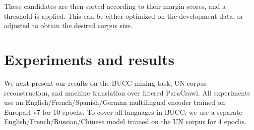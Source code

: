 \documentclass[11pt,a4paper]{article}
\begin{document}
These candidates are then sorted according to their margin scores, and a threshold is applied. This can be either optimized on the development data, or adjusted to obtain the desired corpus size.



\section{Experiments and results}
\label{sec:experiments}

We next present our results on the BUCC mining task, UN corpus reconstruction, and machine translation over filtered ParaCrawl. All experiments use an English/French/Spanish/German multilingual encoder trained on Europarl v7 \cite{Koehn:2005:mtsummit_eurparl} for 10 epochs. To cover all languages in BUCC, we use a separate English/French/Russian/Chinese model trained on the UN corpus \citep{ziemski2016united} for 4 epochs.
\end{document}
